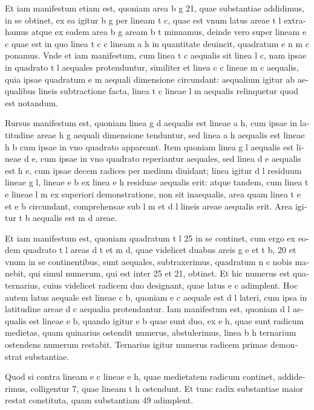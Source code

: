 \documentclass[11pt,a4paper]{book}
\begin{document}
\textlatin{Et iam manifestum etiam est, quoniam area b g 21, quae substantiae addidimus, in se obtinet, ex ea igitur b g per lineam t c, quae est vnum latus areae t l extrahamus atque ex eadem area b g aream b t minuamus, deinde vero super lineam e c quae est in quo linea t c c lineam a h in quantitate deuincit, quadratum e n m c ponamus. Vnde et iam manifestum, cum linea t c aequalis sit linea l c, nam ipsae in quadrato t l aequales protenduntur, similiter et linea c c lineae m c aequalis, quia ipsae quadratum e m aequali dimensione circundant: aequalium igitur ab aequalibus lineis subtractione facta, linea t c lineae l m aequalis relinquetur quod est notandum.}

\textlatin{Rursus manifestum est, quoniam linea g d aequalis est lineae a h, cum ipsae in latitudine areae h g aequali dimensione tenduntur, sed linea a h aequalis est lineae h b cum ipsae in vno quadrato appareant. Item quoniam linea g l aequalis est lineae d e, cum ipsae in vno quadrato reperiantur aequales, sed linea d e aequalis est h e, cum ipsae decem radices per medium diuidant; linea igitur d l residuum lineae g l, lineae e b ex linea e h residuae aequalis erit: atque tandem, cum linea t e lineae l m ex superiori demonstratione, non sit inaequalis, area quam linea t e et e b circundant, comprehensae sub l m et d l lineis areae aequalis erit. Area igitur t b aequalis est m d areae.}

\textlatin{Et iam manifestum est, quoniam quadratum t l 25 in se continet, cum ergo ex eodem quadrato t l areas d t et m d, quae videlicet duabus areis g e et t b, 20 et vnum in se continentibus, sunt aequales, subtraxerimus, quadratum n c nobis manebit, qui simul numerum, qui est inter 25 et 21, obtinet. Et hic numerus est quaternarius, cuius videlicet radicem duo designant, quae latus e c adimplent. Hoc autem latus aequale est lineae c b, quoniam e c aequale est d l lateri, cum ipsa in latitudine areae d c aequalia protendantur. Iam manifestum est, quoniam d l aequalis est lineae e b, quando igitur e b quae sunt duo, ex e h, quae sunt radicum medietas, quam quinarius ostendit numerus, abstulerimus, linea b h ternarium ostendens numerum restabit. Ternarius igitur numerus radicem primae demonstrat substantiae.}

\textlatin{Quod si contra lineam e c lineae e h, quae medietatem radicum continet, addiderimus, colligentur 7, quae lineam t h ostendunt. Et tunc radix substantiae maior restat constituta, quam substantiam 49 adimplent.}

\vspace{1cm}
\end{document}

